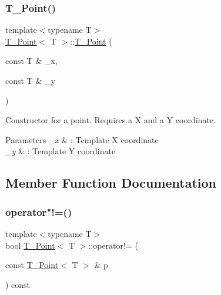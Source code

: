 \subsubsection{\texorpdfstring{T\+\_\+\+Point()}{T\_Point()}\hspace{0.1cm}{\footnotesize\ttfamily [7/7]}}
{\footnotesize\ttfamily template$<$typename T$>$ \\
\hyperlink{classT__Point}{T\+\_\+\+Point}$<$ T $>$\+::\hyperlink{classT__Point}{T\+\_\+\+Point} (\begin{DoxyParamCaption}\item[{const T \&}]{\+\_\+x,  }\item[{const T \&}]{\+\_\+y }\end{DoxyParamCaption})\hspace{0.3cm}{\ttfamily [inline]}}



Constructor for a point. Requires a X and a Y coordinate. 


\begin{DoxyParams}{Parameters}
{\em \+\_\+x} & \+: Template X coordinate \\
\hline
{\em \+\_\+y} & \+: Template Y coordinate \\
\hline
\end{DoxyParams}


\subsection{Member Function Documentation}
\mbox{\label{classT__Point_ab92f1605c6f5008b42105b4c7a7fc1b2}} 
\subsubsection{\texorpdfstring{operator"!=()}{operator!=()}\hspace{0.1cm}{\footnotesize\ttfamily [1/2]}}
{\footnotesize\ttfamily template$<$typename T$>$ \\
bool \hyperlink{classT__Point}{T\+\_\+\+Point}$<$ T $>$\+::operator!= (\begin{DoxyParamCaption}\item[{const \hyperlink{classT__Point}{T\+\_\+\+Point}$<$ T $>$ \&}]{p }\end{DoxyParamCaption}) const\hspace{0.3cm}{\ttfamily [inline]}}



